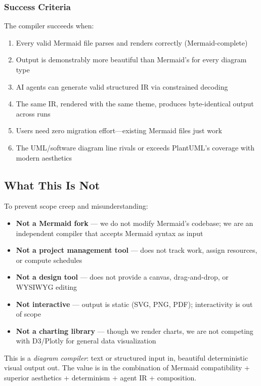 \subsubsection{Success Criteria}

The compiler succeeds when:

\begin{enumerate}
  \item Every valid Mermaid file parses and renders correctly (Mermaid-complete)
  \item Output is demonstrably more beautiful than Mermaid's for every diagram type
  \item AI agents can generate valid structured IR via constrained decoding
  \item The same IR, rendered with the same theme, produces byte-identical output across runs
  \item Users need zero migration effort---existing Mermaid files just work
  \item The UML/software diagram line rivals or exceeds PlantUML's coverage with modern aesthetics
\end{enumerate}

\subsection{What This Is Not}

To prevent scope creep and misunderstanding:

\begin{itemize}
  \item \textbf{Not a Mermaid fork} --- we do not modify Mermaid's codebase; we are an independent compiler that accepts Mermaid syntax as input
  \item \textbf{Not a project management tool} --- does not track work, assign resources, or compute schedules
  \item \textbf{Not a design tool} --- does not provide a canvas, drag-and-drop, or WYSIWYG editing
  \item \textbf{Not interactive} --- output is static (SVG, PNG, PDF); interactivity is out of scope
  \item \textbf{Not a charting library} --- though we render charts, we are not competing with D3/Plotly for general data visualization
\end{itemize}

This is a \emph{diagram compiler}: text or structured input in, beautiful deterministic visual output out. The value is in the combination of Mermaid compatibility + superior aesthetics + determinism + agent IR + composition.
